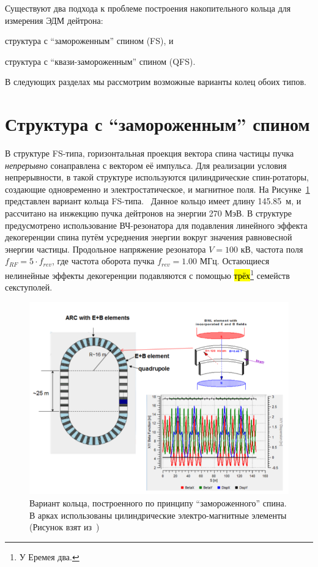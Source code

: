 
Существуют два подхода к проблеме построения накопительного кольца для измерения ЭДМ дейтрона: 
\begin{enumerate*}
	\item структура с ``замороженным'' спином (FS), и 
	\item структура с ``квази-замороженным'' спином (QFS).
\end{enumerate*}

В следующих разделах мы рассмотрим возможные варианты колец обоих типов.

\section{Структура с ``замороженным'' спином} \label{chpt2:lattice:FS_BNL}
В структуре FS-типа, горизонтальная проекция вектора спина частицы пучка \emph{непрерывно} сонаправлена с вектором её импульса. Для реализации условия непрерывности, в такой структуре используются цилиндрические спин-ротаторы, создающие одновременно и электростатическое, и магнитное поля. На Рисунке~\ref{fig:BNL_lattice} представлен вариант кольца FS-типа.~\cite{Senichev:Lattices} Данное кольцо имеет длину 145.85~м, и рассчитано на инжекцию пучка дейтронов на энергии 270 МэВ. В структуре предусмотрено использование ВЧ-резонатора для подавления линейного эффекта декогеренции спина путём усреднения энергии вокруг значения равновесной энергии частицы. Продольное напряжение резонатора $V = 100$ кВ, частота поля $f_{RF} = 5\cdot f_{rev}$, где частота оборота пучка $f_{rev} = 1.00$ МГц. Остающиеся нелинейные эффекты декогеренции подавляются с помощью \hl{трёх}\footnote{У Еремея два.} семейств секступолей.

\begin{figure}[h!]
	\centering
	\includegraphics[width=\linewidth]{images/chapter2/BNL_lattice}
	\caption{Вариант кольца, построенного по принципу ``замороженного'' спина. В арках использованы цилиндрические электро-магнитные элементы (Рисунок взят из~\cite{Senichev:Lattices})\label{fig:BNL_lattice}}
\end{figure}


